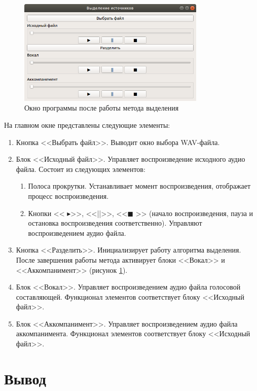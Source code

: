 \begin{figure}
	\centering
	\includegraphics[width=0.8\textwidth]{inc/img/complete-window}
	\caption{Окно программы после работы метода выделения}
	\label{imp:complete}
\end{figure}

На главном окне представлены следующие элементы:

\begin{enumerate}
	\item Кнопка <<Выбрать файл>>. Выводит окно выбора WAV-файла.
	\item Блок <<Исходный файл>>. Управляет воспроизведение исходного аудио файла. Состоит из следующих элементов:
	\begin{enumerate}
		\item Полоса прокрутки. Устанавливает момент воспроизведения, отображает процесс воспроизведения.
		\item Кнопки << $ \blacktriangleright $>>, <<||>>, <<$\blacksquare$ >> (начало воспроизведения, пауза и остановка воспроизведения соответственно). Управляют воспроизведением аудио файла.
	\end{enumerate}
	\item Кнопка <<Разделить>>. Инициализирует работу алгоритма выделения. После завершения работы метода активирует блоки <<Вокал>> и <<Аккомпанимент>> (рисунок \ref{imp:complete}).

	\item Блок <<Вокал>>. Управляет воспроизведением аудио файла голосовой составляющей. Функционал элементов соответствует блоку <<Исходный файл>>.
	\item Блок <<Аккомпанимент>>. Управляет воспроизведением аудио файла аккомпанимента. Функционал элементов соответствует блоку <<Исходный файл>>. 
\end{enumerate}


\section{Вывод}

